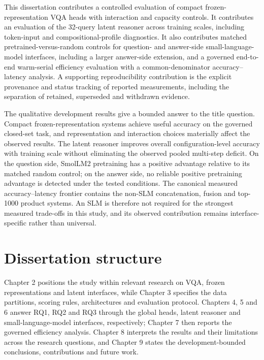 This dissertation contributes a controlled evaluation of compact
frozen-representation VQA heads with interaction and capacity controls. It
contributes an evaluation of the 32-query latent reasoner across training
scales, including token-input and compositional-profile diagnostics. It also
contributes matched pretrained-versus-random controls for question- and
answer-side small-language-model interfaces, including a larger answer-side
extension, and a governed end-to-end warm-serial efficiency evaluation with a
common-denominator accuracy--latency analysis. A supporting reproducibility
contribution is the explicit provenance and status tracking of reported
measurements, including the separation of retained, superseded and withdrawn
evidence.

The qualitative development results give a bounded answer to the title
question. Compact frozen-representation systems achieve useful accuracy on the
governed closed-set task, and representation and interaction choices
materially affect the observed results. The latent reasoner improves overall
configuration-level accuracy with training scale without eliminating the
observed pooled multi-step deficit. On the question side, SmolLM2 pretraining
has a positive advantage relative to its matched random control; on the answer
side, no reliable positive pretraining advantage is detected under the tested
conditions. The canonical measured accuracy--latency frontier contains the
non-SLM concatenation, fusion and top-1000 product systems. An SLM is therefore
not required for the strongest measured trade-offs in this study, and its
observed contribution remains interface-specific rather than universal.

\section{Dissertation structure}
\label{sec:ch1-structure}

Chapter 2 positions the study within relevant research on VQA, frozen
representations and latent interfaces, while Chapter 3 specifies the data
partitions, scoring rules, architectures and evaluation protocol. Chapters 4,
5 and 6 answer RQ1,
RQ2 and RQ3 through the global heads, latent reasoner and small-language-model
interfaces, respectively; Chapter 7 then reports the governed efficiency
analysis. Chapter 8 interprets the results and their limitations across the
research questions, and Chapter 9 states the development-bounded conclusions,
contributions and future work.
